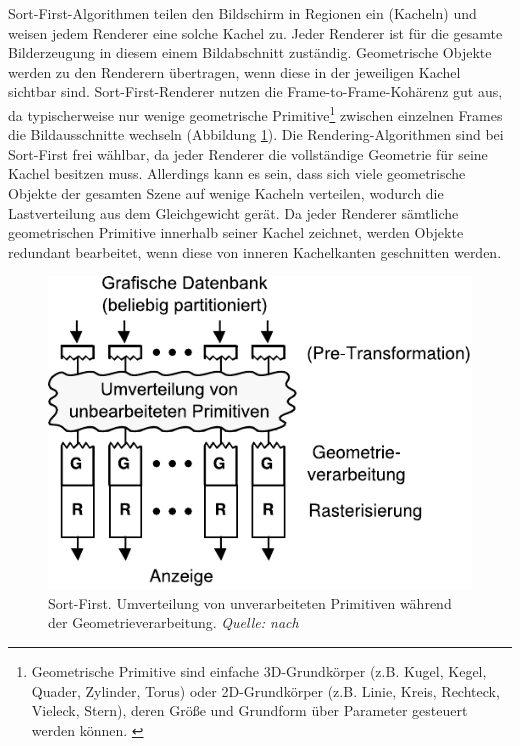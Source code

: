 Sort-First-Algorithmen teilen den Bildschirm in Regionen ein (Kacheln) und weisen jedem Renderer eine solche Kachel zu. Jeder Renderer ist für die gesamte Bilderzeugung in diesem einem Bildabschnitt zuständig. Geometrische Objekte werden zu den Renderern übertragen, wenn diese in der jeweiligen Kachel sichtbar sind. Sort-First-Renderer nutzen die Frame-to-Frame-Kohärenz gut aus, da typischerweise nur wenige geometrische Primitive\footnote{Geometrische Primitive sind einfache 3D-Grundkörper (z.B. Kugel, Kegel, Quader, Zylinder, Torus) oder 2D-Grundkörper (z.B. Linie, Kreis, Rechteck, Vieleck, Stern), deren Größe und Grundform über Parameter gesteuert werden können. \cite{medieninfo}} zwischen einzelnen Frames die Bildausschnitte wechseln (Abbildung \ref{fig:relwork:sortfirst}). Die Rendering-Algorithmen sind bei Sort-First frei wählbar, da jeder Renderer die vollständige Geometrie für seine Kachel besitzen muss. Allerdings kann es sein, dass sich viele geometrische Objekte der gesamten Szene auf wenige Kacheln verteilen, wodurch die Lastverteilung aus dem Gleichgewicht gerät. Da jeder Renderer sämtliche geometrischen Primitive innerhalb seiner Kachel zeichnet, werden Objekte redundant bearbeitet, wenn diese von inneren Kachelkanten geschnitten werden.
\begin{figure}
 \centering
  \includegraphics[scale=0.8]{images/sort-first.pdf}
  \caption{Sort-First. Umverteilung von unverarbeiteten Primitiven während der Geometrieverarbeitung. \textit{Quelle: nach \cite{molnar}}}
 \label{fig:relwork:sortfirst}
\end{figure}

